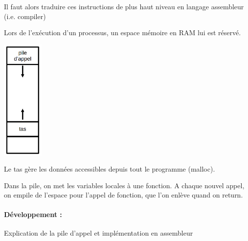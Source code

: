 Il faut alors traduire ces instructions de plus haut niveau en langage assembleur (i.e. compiler)

\begin{principe}
	Lors de l'exécution d'un processus, un espace mémoire en RAM lui est réservé. 
\end{principe}

\begin{minipage}{0.2\linewidth}
	\includegraphics[height=6cm]{lecon/23-archi-assembleur/pile.png}
\end{minipage} \qquad
\begin{minipage}{0.6\linewidth}
	\begin{principe}    
		Le tas gère les données accessibles depuis tout le programme (malloc).
		
		Dans la pile, on met les variables locales à une fonction. A chaque nouvel appel, on empile de l'espace pour l'appel de fonction, que l'on enlève quand on return.
	\end{principe}
\end{minipage}

\paragraph{Développement :} Explication de la pile d'appel et implémentation en assembleur